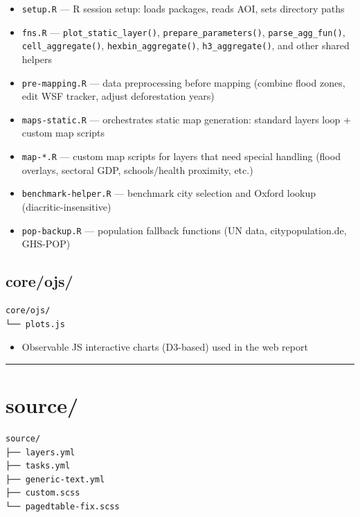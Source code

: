 \documentclass[
  letterpaper,
  DIV=11,
  numbers=noendperiod]{scrreprt}
\providecommand{\tightlist}{%
  \setlength{\itemsep}{0pt}\setlength{\parskip}{0pt}}
\begin{document}
\begin{itemize}
\tightlist
\item
  \texttt{setup.R} --- R session setup: loads packages, reads AOI, sets
  directory paths
\item
  \texttt{fns.R} --- \texttt{plot\_static\_layer()},
  \texttt{prepare\_parameters()}, \texttt{parse\_agg\_fun()},
  \texttt{cell\_aggregate()}, \texttt{hexbin\_aggregate()},
  \texttt{h3\_aggregate()}, and other shared helpers
\item
  \texttt{pre-mapping.R} --- data preprocessing before mapping (combine
  flood zones, edit WSF tracker, adjust deforestation years)
\item
  \texttt{maps-static.R} --- orchestrates static map generation:
  standard layers loop + custom map scripts
\item
  \texttt{map-*.R} --- custom map scripts for layers that need special
  handling (flood overlays, sectoral GDP, schools/health proximity,
  etc.)
\item
  \texttt{benchmark-helper.R} --- benchmark city selection and Oxford
  lookup (diacritic-insensitive)
\item
  \texttt{pop-backup.R} --- population fallback functions (UN data,
  citypopulation.de, GHS-POP)
\end{itemize}

\subsection{core/ojs/}\label{coreojs}

\begin{verbatim}
core/ojs/
└── plots.js
\end{verbatim}

\begin{itemize}
\tightlist
\item
  Observable JS interactive charts (D3-based) used in the web report
\end{itemize}

\begin{center}\rule{0.5\linewidth}{0.5pt}\end{center}

\section{source/}\label{source}

\begin{verbatim}
source/
├── layers.yml
├── tasks.yml
├── generic-text.yml
├── custom.scss
└── pagedtable-fix.scss
\end{verbatim}
\end{document}
